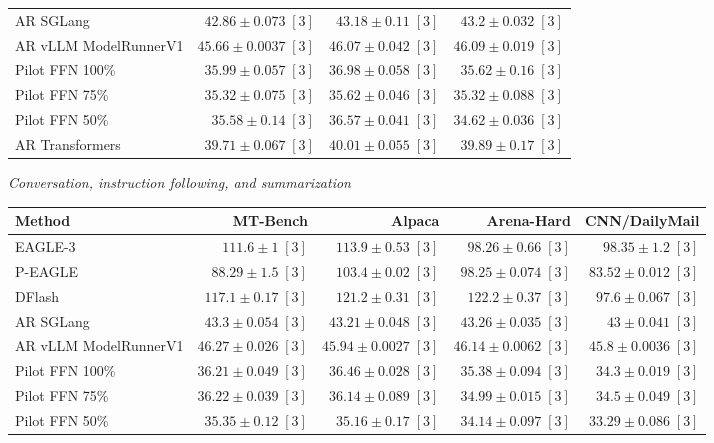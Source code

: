 \begin{table}[!htp]
\begin{tabular}{@{}>{\raggedright\arraybackslash}p{3.7cm}rrr@{}}
AR \textperiodcentered{} SGLang & \(42.86 \pm 0.073\;[3]\) & \(43.18 \pm 0.11\;[3]\) & \(43.2 \pm 0.032\;[3]\) \\
AR \textperiodcentered{} vLLM ModelRunnerV1 & \(45.66 \pm 0.0037\;[3]\) & \(46.07 \pm 0.042\;[3]\) & \(46.09 \pm 0.019\;[3]\) \\
Pilot FFN 100\% & \(35.99 \pm 0.057\;[3]\) & \(36.98 \pm 0.058\;[3]\) & \(35.62 \pm 0.16\;[3]\) \\
Pilot FFN 75\% & \(35.32 \pm 0.075\;[3]\) & \(35.62 \pm 0.046\;[3]\) & \(35.32 \pm 0.088\;[3]\) \\
Pilot FFN 50\% & \(35.58 \pm 0.14\;[3]\) & \(36.57 \pm 0.041\;[3]\) & \(34.62 \pm 0.036\;[3]\) \\
AR \textperiodcentered{} Transformers & \(39.71 \pm 0.067\;[3]\) & \(40.01 \pm 0.055\;[3]\) & \(39.89 \pm 0.17\;[3]\) \\
\bottomrule
\end{tabular}\par\medskip
\textit{Conversation, instruction following, and summarization}\par\smallskip
\begin{tabular}{@{}>{\raggedright\arraybackslash}p{3.7cm}rrrr@{}}
\toprule
Method & MT-Bench & Alpaca & Arena-Hard & CNN/DailyMail \\
\midrule
EAGLE-3 & \(111.6 \pm 1\;[3]\) & \(113.9 \pm 0.53\;[3]\) & \(98.26 \pm 0.66\;[3]\) & \(\mathbf{98.35} \pm 1.2\;[3]\) \\
P-EAGLE & \(88.29 \pm 1.5\;[3]\) & \(103.4 \pm 0.02\;[3]\) & \(98.25 \pm 0.074\;[3]\) & \(83.52 \pm 0.012\;[3]\) \\
DFlash & \(\mathbf{117.1} \pm 0.17\;[3]\) & \(\mathbf{121.2} \pm 0.31\;[3]\) & \(\mathbf{122.2} \pm 0.37\;[3]\) & \(97.6 \pm 0.067\;[3]\) \\
AR \textperiodcentered{} SGLang & \(43.3 \pm 0.054\;[3]\) & \(43.21 \pm 0.048\;[3]\) & \(43.26 \pm 0.035\;[3]\) & \(43 \pm 0.041\;[3]\) \\
AR \textperiodcentered{} vLLM ModelRunnerV1 & \(46.27 \pm 0.026\;[3]\) & \(45.94 \pm 0.0027\;[3]\) & \(46.14 \pm 0.0062\;[3]\) & \(45.8 \pm 0.0036\;[3]\) \\
Pilot FFN 100\% & \(36.21 \pm 0.049\;[3]\) & \(36.46 \pm 0.028\;[3]\) & \(35.38 \pm 0.094\;[3]\) & \(34.3 \pm 0.019\;[3]\) \\
Pilot FFN 75\% & \(36.22 \pm 0.039\;[3]\) & \(36.14 \pm 0.089\;[3]\) & \(34.99 \pm 0.015\;[3]\) & \(34.5 \pm 0.049\;[3]\) \\
Pilot FFN 50\% & \(35.35 \pm 0.12\;[3]\) & \(35.16 \pm 0.17\;[3]\) & \(34.14 \pm 0.097\;[3]\) & \(33.29 \pm 0.086\;[3]\) \\

\end{tabular}
\end{table}
